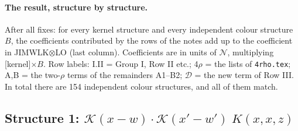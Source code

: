 \documentclass[10pt]{article}
\numberwithin{equation}{section}
\newcommand{\KK}{\mathcal K}
\newcommand{\NN}{\mathcal N}
\begin{document}
\paragraph{The result, structure by structure.} After all fixes: for every kernel structure and every independent colour structure $B$, the coefficients contributed by the rows of the notes add up to the coefficient in JIMWLK$\otimes$LO (last column). Coefficients are in units of $\NN$, multiplying [kernel]$\times B$. Row labels: I.II = Group I, Row II etc.; 4$\rho$ = the lists of \texttt{4rho.tex}; A,B = the two-$\rho$ terms of the remainders A1--B2; $\mathcal D$ = the new term of Row III. In total there are 154 independent colour structures, and all of them match.
\subsection*{Structure 1: $\KK(x-w)\cdot\KK(x'-w')\;K(x,x,z)$}
\end{document}
